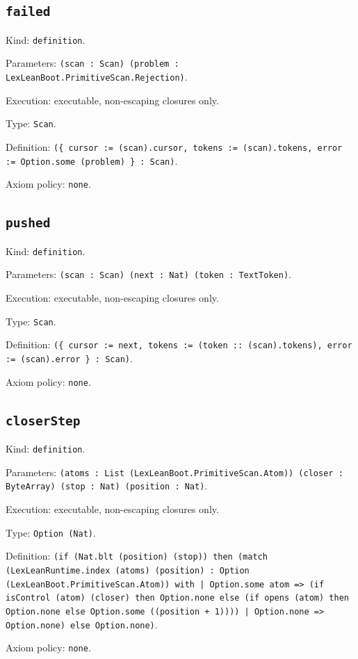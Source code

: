 \documentclass[11pt]{article}
\begin{document}
\subsection*{\texttt{failed}}
\noindent Kind: \texttt{definition}.\par
\noindent Parameters: \texttt{(scan : Scan) (problem : LexLeanBoot.PrimitiveScan.Rejection)}.\par
\noindent Execution: executable, non-escaping closures only.\par
\noindent Type: \texttt{Scan}.\par
\noindent Definition: \texttt{(\{ cursor := (scan).cursor, tokens := (scan).tokens, error := Option.some (problem) \} : Scan)}.\par
\noindent Axiom policy: \texttt{none}.\par
\subsection*{\texttt{pushed}}
\noindent Kind: \texttt{definition}.\par
\noindent Parameters: \texttt{(scan : Scan) (next : Nat) (token : TextToken)}.\par
\noindent Execution: executable, non-escaping closures only.\par
\noindent Type: \texttt{Scan}.\par
\noindent Definition: \texttt{(\{ cursor := next, tokens := (token :: (scan).tokens), error := (scan).error \} : Scan)}.\par
\noindent Axiom policy: \texttt{none}.\par
\subsection*{\texttt{closerStep}}
\noindent Kind: \texttt{definition}.\par
\noindent Parameters: \texttt{(atoms : List (LexLeanBoot.PrimitiveScan.Atom)) (closer : ByteArray) (stop : Nat) (position : Nat)}.\par
\noindent Execution: executable, non-escaping closures only.\par
\noindent Type: \texttt{Option (Nat)}.\par
\noindent Definition: \texttt{(if (Nat.blt (position) (stop)) then (match (LexLeanRuntime.index (atoms) (position) : Option (LexLeanBoot.PrimitiveScan.Atom)) with | Option.some atom => (if isControl (atom) (closer) then Option.none else (if opens (atom) then Option.none else Option.some ((position + 1)))) | Option.none => Option.none) else Option.none)}.\par
\noindent Axiom policy: \texttt{none}.\par
\end{document}
